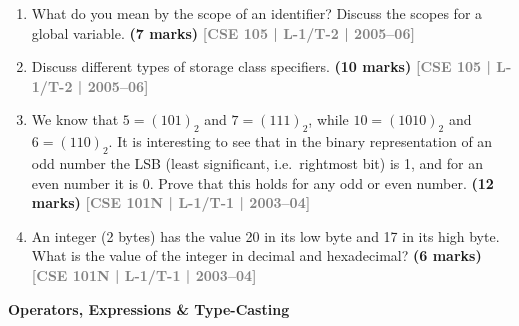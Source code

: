 \documentclass[12pt,a3paper]{article}
\newcommand{\yr}[1]{\hfill\textcolor{gray}{\small\textbf{[#1]}}}
\newcommand{\mk}[1]{\textcolor{orange!70!black}{\small\textbf{(#1 marks)}}}
\newcommand{\subtopic}[2]{%
  \vspace{10pt}
  \noindent\begin{tcolorbox}[colback=#1!8,colframe=#1,boxrule=0.6pt,arc=4pt,
    left=6pt,right=6pt,top=4pt,bottom=4pt]
    \small\bfseries\textcolor{#1}{#2}
  \end{tcolorbox}
  \vspace{2pt}
}
\begin{document}
\begin{enumerate}
\item What do you mean by the scope of an identifier? Discuss the scopes for a global variable.
\mk{7} \yr{CSE 105 | L-1/T-2 | 2005--06}

\item Discuss different types of storage class specifiers.
\mk{10} \yr{CSE 105 | L-1/T-2 | 2005--06}

\item We know that $5 = (101)_2$ and $7 = (111)_2$, while $10 = (1010)_2$ and $6 = (110)_2$. It is interesting to see that in the binary representation of an odd number the LSB (least significant, i.e.\ rightmost bit) is 1, and for an even number it is 0. Prove that this holds for any odd or even number.
\mk{12} \yr{CSE 101N | L-1/T-1 | 2003--04}

\item An integer (2 bytes) has the value 20 in its low byte and 17 in its high byte. What is the value of the integer in decimal and hexadecimal?
\mk{6} \yr{CSE 101N | L-1/T-1 | 2003--04}

\end{enumerate}

\subtopic{cA}{Operators, Expressions \& Type-Casting}
\label{sub:s1-operators}
\end{document}
